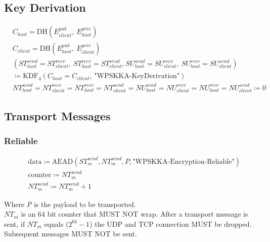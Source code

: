 \documentclass{article}
\begin{document}
    \subsection{Key Derivation}

    \begin{align*}
        & C_{host} = \text{DH}(E_{client}^{pub},\ E_{host}^{priv})\\
        & C_{client} = \text{DH}(E_{host}^{pub},\ E_{client}^{priv})\\
        & (\mathit{ST}_{host}^{send} = \mathit{ST}_{client}^{recv},\ \mathit{ST}_{host}^{recv} =
        \mathit{ST}_{client}^{send}, \mathit{SU}_{host}^{send} = \mathit{SU}_{client}^{recv},\
        \mathit{SU}_{host}^{recv} = \mathit{SU}_{client}^{send}) \\
        & \coloneqq\text{KDF}_4(C_{host} = C_{client}, \
        \text{"WPSKKA-KeyDerivation"}) \\
        & \mathit{NT}_{host}^{send} = \mathit{NT}_{client}^{recv} = \mathit{NT}_{host}^{recv} = \mathit{NT}_{client}^{send} = \mathit{NU}_{host}^{send} = \mathit{NU}_{client}^{recv} = \mathit{NU}_{host}^{recv} = \mathit{NU}_{client}^{send} \coloneqq 0
    \end{align*}

    \subsection{Transport Messages}

    \subsubsection{Reliable}

    \begin{align*}
        & \text{data} \coloneqq \text{AEAD}(\mathit{ST}_{m}^{send},\mathit{NT}_{m}^{send}, P,
        \text{"WPSKKA-Encryption-Reliable"})\\
        & \text{counter} \coloneqq \mathit{NT}_{m}^{send}\\
        & \mathit{NT}_{m}^{send} \coloneqq \mathit{NT}_{m}^{send} + 1
    \end{align*}


    Where \emph{P} is the payload to be transported.\\

    $\mathit{NT}_{m}$ is an 64 bit counter that MUST NOT wrap. After a transport message is sent, if $\mathit{NT}_{m}$ equals
    ($2^{64}-1$) the UDP and TCP connection MUST be dropped. Subsequent messages MUST NOT be sent. \\
\end{document}
